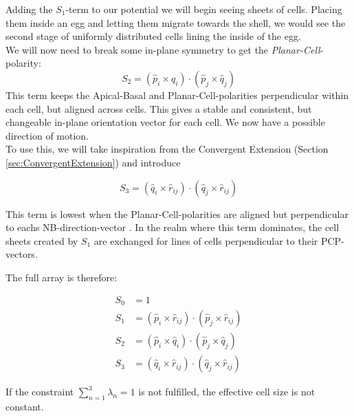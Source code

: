 Adding the $S_1$-term to our potential we will begin seeing sheets of cells. Placing them inside an egg and letting them migrate towards the shell, we would see the second stage of uniformly distributed cells lining the inside of the egg. \\

We will now need to break some in-plane symmetry to get the \textit{Planar-Cell}-polarity:
\begin{equation*}
    S_2=\left(\hat{p}_i \times \hat{q}_{i}\right) \cdot\left(\hat{p}_j \times \hat{q}_{j}\right)
\end{equation*}
This term keeps the Apical-Basal and Planar-Cell-polarities perpendicular within each cell, but aligned across cells. This gives a stable and consistent, but changeable in-plane orientation vector for each cell. We now have a possible direction of motion.\\

To use this, we will take inspiration from the Convergent Extension (Section \ref{sec:ConvergentExtension}) and introduce 

\begin{equation*}
    S_3=\left(\hat{q}_i \times \hat{r}_{i j}\right) \cdot\left(\hat{q}_j \times \hat{r}_{i j}\right)
\end{equation*}

This term is lowest when the Planar-Cell-polarities are aligned but perpendicular to eachs NB-direction-vector . In the realm where this term dominates, the cell sheets created by $S_1$ are exchanged for lines of cells perpendicular to their PCP-vectors. 


The full array is therefore:

\begin{subequations}
\begin{align}
S_0&=1\label{eq:s0}\\
S_1&=\left(\hat{p}_i \times \hat{r}_{i j}\right) \cdot\left(\hat{p}_j \times \hat{r}_{i j}\right)\label{eq:s1}\\
S_2&=\left(\hat{p}_i \times \hat{q}_{i}\right) \cdot\left(\hat{p}_j \times \hat{q}_{j}\right)\label{eq:s2}\\
S_3&=\left(\hat{q}_i \times \hat{r}_{i j}\right) \cdot\left(\hat{q}_j \times \hat{r}_{i j}\right)\label{eq:s3}
\end{align}
\end{subequations}

If the constraint $\sum_{n=1}^{3}\lambda_n=1$ is not fulfilled, the effective cell size is not constant.\\

